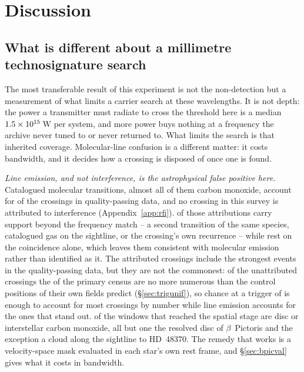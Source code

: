 \section{Discussion}
\label{sec:discussion}

\subsection{What is different about a millimetre technosignature search}
\label{sec:mmdifferent}

The most transferable result of this experiment is not the non-detection but
a measurement of what limits a carrier search at these wavelengths. It is not
depth: the power a transmitter must radiate to cross the threshold here is a median
$1.5\times10^{15}$\,W per system, and more power buys nothing at a
frequency the archive never tuned to or never returned to. What limits the
search is that inherited coverage. Molecular-line confusion is a different
matter: it costs bandwidth, and it decides how a crossing is disposed of once
one is found.

\emph{Line emission, and not interference, is the astrophysical false
positive here.}
Catalogued molecular transitions, almost all of them carbon monoxide, account
for \EvNAttrQp{} of the \EvNCrossQp{} crossings in quality-passing data, and
no crossing in this survey is attributed to interference
(Appendix~\ref{app:rfi}). \LnAttrSupp{} of those attributions carry support
beyond the frequency match -- a second transition of the same species,
catalogued gas on the sightline, or the crossing's own recurrence -- while
\LnAttrCoincWord{} rest on the coincidence alone, which leaves them
consistent with molecular emission rather than identified as it. The
attributed crossings include the strongest events in the quality-passing
data, but they are
not the commonest: of the \EvNUnattrQp{} unattributed crossings the \CeObs{}
of the primary census are no more numerous than the control positions of
their own fields predict
(\S\ref{sec:trigunif}), so chance at a trigger of \StageNullTrig{} is enough
to account for most crossings by number while line emission accounts for the
ones that stand out.
\DiscFpWin{} of the \DiscFpOfFlags{} windows that reached the spatial stage
are disc or interstellar carbon monoxide, all but one the resolved disc of
$\beta$~Pictoris and the exception a cloud along the sightline to
HD~48370. The remedy that works is a velocity-space mask evaluated in each star's
own rest frame, and \S\ref{sec:bpicval} gives what it costs in
bandwidth.

